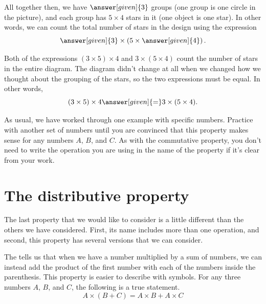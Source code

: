 \documentclass{ximera}
\begin{document}
\begin{example}
\begin{image}
\end{image}
All together then, we have $\answer[given]{3}$ groups (one group is one circle in the picture), and each group has $5 \times 4$ stars in it (one object is one star). In other words, we can count the total number of stars in the design using the expression
\[
\answer[given]{3} \times \left ( 5 \times \answer[given]{4} \right ).
\]

Both of the expressions $(3 \times 5) \times 4$ and $3 \times (5 \times 4)$ count the number of stars in the entire diagram. The diagram didn't change at all when we changed how we thought about the grouping of the stars, so the two expressions must be equal. In other words, 
\[
(3 \times 5) \times 4 \answer[given]{=} 3 \times (5 \times 4).
\]
\end{example}

As usual, we have worked through one example with specific numbers. Practice with another set of numbers until you are convinced that this property makes sense for any numbers $A$, $B$, and $C$. As with the commutative property, you don't need to write the operation you are using in the name of the property if it's clear from your work. 


\section{The distributive property}

The last property that we would like to consider is a little different than the others we have considered. First, its name includes more than one operation, and second, this property has several versions that we can consider.

\begin{definition}
The  tells us that when we have a number multiplied by a sum of numbers, we can instead add the product of the first number with each of the numbers inside the parenthesis. This property is easier to describe with symbols. For any three numbers $A$, $B$, and $C$, the following is a true statement.
\[
A \times (B+C) = A \times B + A \times C
\]
\end{definition}
\end{document}
